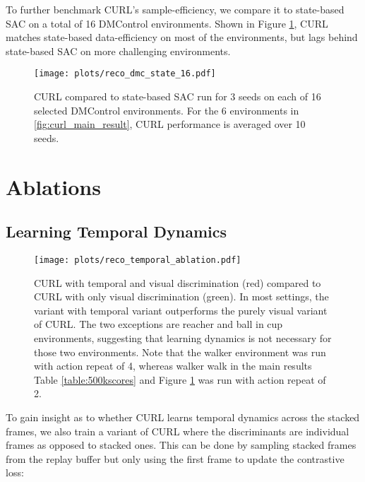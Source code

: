 \documentclass{article}
\begin{document}
To further benchmark CURL's sample-efficiency, we compare it to state-based SAC on a total of 16 DMControl environments. Shown in Figure \ref{fig:curl_all_dmc}, CURL matches state-based data-efficiency on most of the environments, but lags behind state-based SAC on more challenging environments.



\begin{figure}[!ht]
 \begin{center}
   \centerline{\texttt{[image: plots/reco\_dmc\_state\_16.pdf]}}
   \caption{CURL compared to state-based SAC run for 3 seeds on each of 16 selected DMControl environments. For the 6 environments in \ref{fig:curl_main_result}, CURL performance is averaged over 10 seeds.}
   \label{fig:curl_all_dmc}
 \end{center}
 \end{figure}
 

\section{Ablations}\label{appendix:ablation}

\subsection{Learning Temporal Dynamics}
\begin{figure}[t]
 \begin{center}
   \centerline{\texttt{[image: plots/reco\_temporal\_ablation.pdf]}}
   \caption{CURL with temporal and visual discrimination (red) compared to CURL with only visual discrimination (green). In most settings, the variant with temporal variant outperforms the purely visual variant of CURL. The two exceptions are reacher and ball in cup environments, suggesting that learning dynamics is not necessary for those two environments. Note that the walker environment was run with action repeat of 4, whereas walker walk in the main results Table \ref{table:500kscores} and Figure \ref{fig:curl_all_dmc} was run with action repeat of 2. }
   \vspace{-6mm}
   \label{fig:curl_temporal_ablation}
 \end{center}
 \end{figure}
 
 To gain insight as to whether CURL learns temporal dynamics across the stacked frames, we also train a variant of CURL where the discriminants are individual frames as opposed to stacked ones. This can be done by sampling stacked frames from the replay buffer but only using the first frame to update the contrastive loss:
\end{document}
